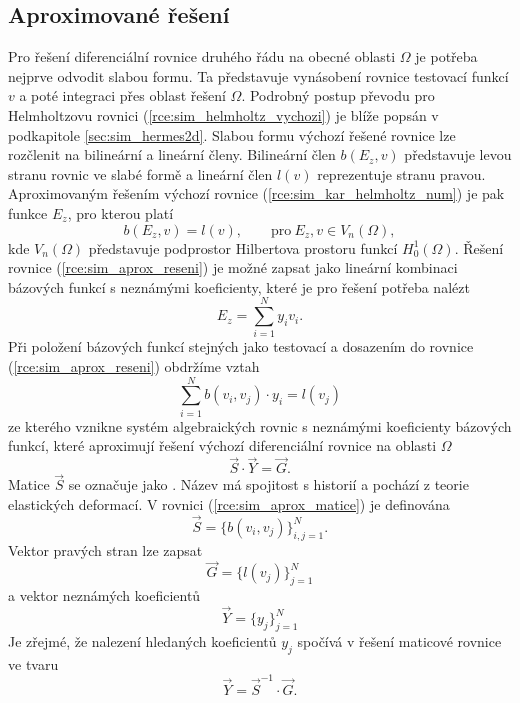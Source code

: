 \subsection{Aproximované řešení}
Pro řešení diferenciální rovnice druhého řádu na obecné oblasti $\Omega$ je potřeba nejprve odvodit slabou formu. Ta představuje vynásobení rovnice testovací funkcí $v$ a poté integraci přes oblast řešení $\Omega$. Podrobný postup převodu pro Helmholtzovu rovnici (\ref{rce:sim_helmholtz_vychozi}) je blíže popsán v podkapitole \ref{sec:sim_hermes2d}. Slabou formu výchozí řešené rovnice lze rozčlenit na bilineární a lineární členy. Bilineární člen $b(E_z,v)$ představuje levou stranu rovnic ve slabé formě a lineární člen $l(v)$ reprezentuje stranu pravou.
Aproximovaným řešením výchozí rovnice (\ref{rce:sim_kar_helmholtz_num}) je pak funkce $E_z$, pro kterou platí 
\begin{equation}
	b(E_z,v) = l(v),\qquad \mathrm{pro}\ E_z, v \in V_{n}(\Omega),
	\label{rce:sim_aprox_reseni}
\end{equation}
kde $V_{n}(\Omega)$ představuje podprostor Hilbertova prostoru funkcí $H_{0}^{1}(\Omega)$. Řešení rovnice (\ref{rce:sim_aprox_reseni}) je možné zapsat jako lineární kombinaci bázových funkcí s neznámými koeficienty, které je pro řešení potřeba nalézt
\begin{displaymath}
	E_z = \sum_{i=1}^{N}y_i v_i.
\end{displaymath}
Při položení bázových funkcí stejných jako testovací a dosazením do rovnice  (\ref{rce:sim_aprox_reseni}) obdržíme vztah
\begin{equation}
	\sum_{i=1}^{N}b(v_i,v_j)\cdot y_i = l(v_j)
	\label{rce:sim_aprox_reseni2}
\end{equation}
ze kterého vznikne systém algebraických rovnic s neznámými koeficienty bázových funkcí, které aproximují řešení výchozí diferenciální rovnice na oblasti $\Omega$
\begin{equation}
	\vec S \cdot \vec Y = \vec G.
	\label{rce:sim_aprox_matice}
\end{equation}
Matice $\vec S$ se označuje jako . Název má spojitost s historií a pochází z teorie elastických deformací. V rovnici (\ref{rce:sim_aprox_matice}) je definována
\begin{displaymath}
	\vec S = \{b(v_i,v_j) \}_{i,j = 1}^{N}.
\end{displaymath}
Vektor pravých stran lze zapsat
\begin{displaymath}
	\vec G = \{l(v_j) \}_{j = 1}^{N}
\end{displaymath}
a vektor neznámých koeficientů
\begin{displaymath}
	\vec Y = \{y_j \}_{j = 1}^{N}
\end{displaymath}
Je zřejmé, že nalezení hledaných koeficientů $y_j$ spočívá v řešení maticové rovnice ve tvaru
\begin{equation}
	\vec Y = \vec S ^{-1}\cdot \vec G.
	\label{rce:sim_aprox_inv_matice}
\end{equation}


